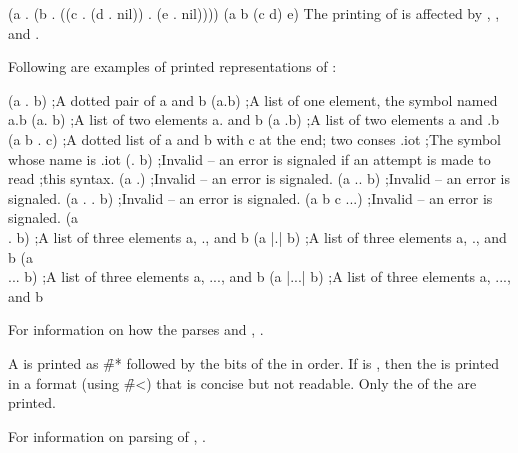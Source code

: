 \code
 (a . (b . ((c . (d . nil)) . (e . nil))))
 (a b (c d) e)
\endcode
The printing of  is affected by ,
, and .


\goodbreak         
Following are examples of printed representations of :

\code
 (a . b)     ;A dotted pair of a and b
 (a.b)       ;A list of one element, the symbol named a.b
 (a. b)      ;A list of two elements a. and b
 (a .b)      ;A list of two elements a and .b
 (a b . c)   ;A dotted list of a and b with c at the end; two conses
 .iot        ;The symbol whose name is .iot
 (. b)       ;Invalid -- an error is signaled if an attempt is made to read 
             ;this syntax.
 (a .)       ;Invalid -- an error is signaled.
 (a .. b)    ;Invalid -- an error is signaled.
 (a . . b)   ;Invalid -- an error is signaled.
 (a b c ...) ;Invalid -- an error is signaled.
 (a \\. b)    ;A list of three elements a, ., and b
 (a |.| b)   ;A list of three elements a, ., and b
 (a \\... b)  ;A list of three elements a, ..., and b
 (a |...| b) ;A list of three elements a, ..., and b
\endcode

For information on how the  parses  and ,
\seesection\LeftParen. 
     
\endsubsubsection%

A  is printed as \f{\#*} followed by the bits of the 
in order.  If  is , then the  is
printed in a format (using \f{\#<}) that is concise but not readable.
Only the   of the  are printed.


For information on  parsing of ,
\seesection\SharpsignStar.

\endsubsubsection%

